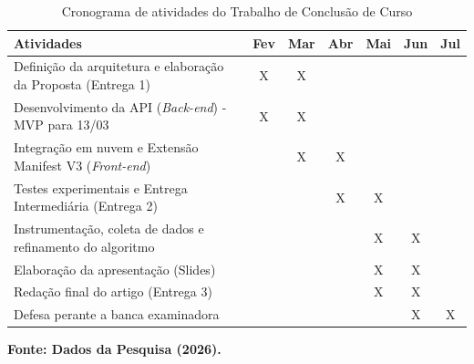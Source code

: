 \documentclass[a4paper,12pt]{article}
\begin{document}
\begin{table}[H]
    \centering
    \caption{Cronograma de atividades do Trabalho de Conclusão de Curso}
    \vspace{0.2cm}
    \begin{tabular}{|m{8cm}|c|c|c|c|c|c|}
        \hline
        \textbf{Atividades} & \textbf{Fev} & \textbf{Mar} & \textbf{Abr} & \textbf{Mai} & \textbf{Jun} & \textbf{Jul} \\
        \hline
        Definição da arquitetura e elaboração da Proposta (Entrega 1) & X & X & & & & \\
        \hline
        Desenvolvimento da API (\textit{Back-end}) - MVP para 13/03 & X & X & & & & \\
        \hline
        Integração em nuvem e Extensão Manifest V3 (\textit{Front-end}) & & X & X & & & \\
        \hline
        Testes experimentais e Entrega Intermediária (Entrega 2) & & & X & X & & \\
        \hline
        Instrumentação, coleta de dados e refinamento do algoritmo & & & & X & X & \\
        \hline
        Elaboração da apresentação (Slides) & & & & X & X & \\
        \hline
        Redação final do artigo (Entrega 3) & & & & X & X & \\
        \hline
        Defesa perante a banca examinadora & & & & & X & X \\
        \hline
    \end{tabular}
    \label{tab:cronograma}
    \vspace{0.2cm}
    \textbf{\footnotesize Fonte: Dados da Pesquisa (2026).}
\end{table}


\newpage



\end{document}
